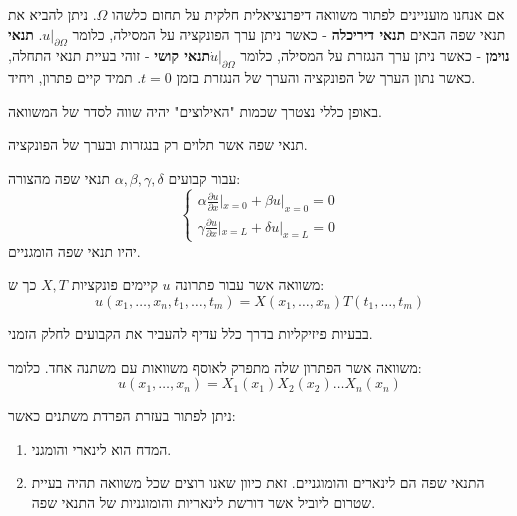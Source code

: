 \documentclass{tstextbook}
\begin{document}
\begin{definition}
אם אנחנו מועניינים לפתור משוואה דיפרנציאלית חלקית על תחום כלשהו \(\Omega\). ניתן להביא את תנאי שפה הבאים
\textbf{תנאי דיריכלה} - כאשר ניתן ערך הפונקציה על המסילה, כלומר \(u|_{\partial\Omega}\).
\textbf{תנאי נוימן} - כאשר ניתן ערך הנגזרת על המסילה, כלומר \(\dot{u}|_{\partial\Omega}\)\textbf{תנאי קושי} - זוהי בעיית תנאי התחלה, כאשר נתון הערך של הפונקציה והערך של הנגזרת בזמן \(t=0\). תמיד קיים פתרון, ויחיד.

\end{definition}
\begin{remark}
באופן כללי נצטרך שכמות "האילוצים" יהיה שווה לסדר של המשוואה.

\end{remark}
\begin{definition}
תנאי שפה אשר תלוים רק בנגזרות ובערך של הפונקציה.

\end{definition}
\begin{example}
עבור קבועים \(\alpha,\beta,\gamma,\delta\) תנאי שפה מהצורה:
$$\begin{cases}\alpha  \frac{\partial u}{\partial x} |_{x=0}+\beta u|_{x=0}=0 \\\gamma \frac{\partial u}{\partial x} |_{x=L}+\delta u|_{x=L}=0
\end{cases}$$
יהיו תנאי שפה הומגניים.

\end{example}
\begin{definition}
משוואה אשר עבור פתרונה \(u\) קיימים פונקציות \(X,T\) כך ש:
$$u\left( x_{1},\dots,x_{n},t_{1},\dots,t_{m} \right)=X\left( x_{1},\dots,x_{n} \right)T\left( t_{1},\dots,t_{m} \right)$$

\end{definition}
\begin{remark}
בבעיות פיזיקליות בדרך כלל עדיף להעביר את הקבועים לחלק הזמני.

\end{remark}
\begin{definition}
משוואה אשר הפתרון שלה מתפרק לאוסף משוואות עם משתנה אחד. כלומר:
$$u\left( x_{1},\dots,x_{n} \right)=X_{1}(x_{1})X_{2}(x_{2})\dots X_{n}(x_{n})$$

\end{definition}
\begin{proposition}
ניתן לפתור בעזרת הפרדת משתנים כאשר:

  \begin{enumerate}
    \item המדח הוא לינארי והומגני. 


    \item התנאי שפה הם לינארים והומוגניים. 
זאת כיוון שאנו רוצים שכל משוואה תהיה בעיית שטרום ליוביל אשר דורשת לינאריות והומוגניות של התנאי שפה.


  \end{enumerate}
\end{proposition}
\end{document}
